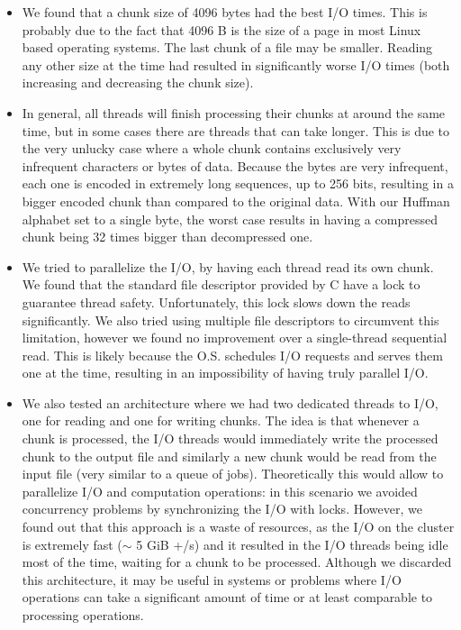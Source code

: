 \begin{itemize}

\item We found that a chunk size of 4096 bytes had the best I/O times. This is probably due to the fact that 4096 B is the size of a page in most Linux based operating systems. The last chunk of a file may be smaller. Reading any other size at the time had resulted in significantly worse I/O times (both increasing and decreasing the chunk size).

\item In general, all threads will finish processing their chunks at around the same time, but in some cases there are threads that can take longer. This is due to the very unlucky case where a whole chunk contains exclusively very infrequent characters or bytes of data. Because the bytes are very infrequent, each one is encoded in extremely long sequences, up to 256 bits, resulting in a bigger encoded chunk than compared to the original data. With our Huffman alphabet set to a single byte, the worst case results in having a compressed chunk being 32 times bigger than decompressed one.

\item We tried to parallelize the I/O, by having each thread read its own chunk. We found that the standard file descriptor provided by C have a lock to guarantee thread safety. Unfortunately, this lock slows down the reads significantly. We also tried using multiple file descriptors to circumvent this limitation, however we found no improvement over a single-thread sequential read. This is likely because the O.S. schedules I/O requests and serves them one at the time, resulting in an impossibility of having truly parallel I/O.

\item We also tested an architecture where we had two dedicated threads to I/O, one for reading and one for writing chunks. The idea is that whenever a chunk is processed, the I/O threads would immediately write the processed chunk to the output file and similarly a new chunk would be read from the input file (very similar to a queue of jobs). Theoretically this would allow to parallelize I/O and computation operations: in this scenario we avoided concurrency problems by synchronizing the I/O with locks. However, we found out that this approach is a waste of resources, as the I/O on the cluster is extremely fast ($\sim$ 5 GiB +/s) and it resulted in the I/O threads being idle most of the time, waiting for a chunk to be processed. Although we discarded this architecture, it may be useful in systems or problems where I/O operations can take a significant amount of time or at least comparable to processing operations.


\end{itemize}
